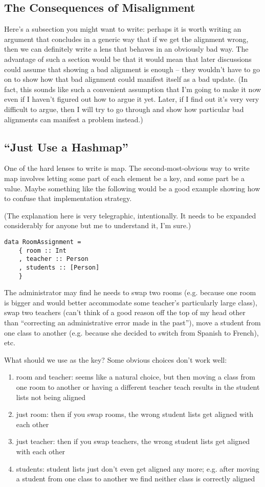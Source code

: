 \subsection{The Consequences of Misalignment}
Here's a subsection you might want to write: perhaps it is worth writing an
argument that concludes in a generic way that if we get the alignment wrong,
then we can definitely write a lens that behaves in an obviously bad way.
The advantage of such a section would be that it would mean that later
discussions could assume that showing a bad alignment is enough -- they
wouldn't have to go on to show how that bad alignment could manifest itself
as a bad update. (In fact, this sounds like such a convenient assumption
that I'm going to make it now even if I haven't figured out how to argue it
yet. Later, if I find out it's very very difficult to argue, then I will try
to go through and show how particular bad alignments can manifest a problem
instead.)

\subsection{``Just Use a Hashmap''}
One of the hard lenses to write is map.
The second-most-obvious way to write map involves letting some part of each
element be a key, and some part be a value.
Maybe something like the following would be a good example showing how to
confuse that implementation strategy.

(The explanation here is very telegraphic, intentionally. It needs to be
expanded considerably for anyone but me to understand it, I'm sure.)

\begin{verbatim}
data RoomAssignment =
    { room :: Int
    , teacher :: Person
    , students :: [Person]
    }
\end{verbatim}

The administrator may find he needs to swap two rooms (e.g. because one room
is bigger and would better accommodate some teacher's particularly large
class), swap two teachers (can't think of a good reason off the top of my
head other than ``correcting an administrative error made in the past''),
move a student from one class to another (e.g. because she decided to switch
from Spanish to French), etc.

What should we use as the key? Some obvious choices don't work well:
\begin{enumerate}
    \item room and teacher: seems like a natural choice, but then moving a
        class from one room to another or having a different teacher teach
        results in the student lists not being aligned
    \item just room: then if you swap rooms, the wrong student lists get aligned
        with each other
    \item just teacher: then if you swap teachers, the wrong student lists get
        aligned with each other
    \item students: student lists just don't even get aligned any more; e.g.
        after moving a student from one class to another we find neither
        class is correctly aligned
\end{enumerate}

